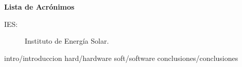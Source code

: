 \documentclass[twoside,a4paper,11pt]{book}
\begin{document}
\newpage
\thispagestyle{empty}

\rule{0cm}{2.5cm}
\begin{flushleft}
{\bf\Huge{Lista de Acrónimos}}
\end{flushleft}

\vspace{1.1cm}
\begin{description}

\item [IES:] Instituto de Energía Solar.

\end{description}

\newpage

\renewcommand{\labelitemi}{$\bullet$}
\baselineskip=15pt

 {intro/introduccion}
 {hard/hardware}
 {soft/software}
 {conclusiones/conclusiones}

\newpage
\mbox{}
\newpage
{}


\end{document}
